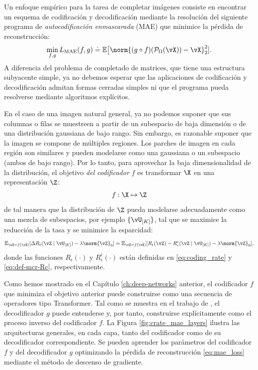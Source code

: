 \documentclass[../../book-main_es.tex]{subfiles}
\begin{document}
Un enfoque empírico para la tarea de completar imágenes consiste en encontrar un
esquema de codificación y decodificación mediante la
resolución del siguiente programa de {\em autocodificación enmascarada} (MAE) que
minimice la pérdida de reconstrucción:
\begin{equation}\label{eq:mae_loss}
    \min_{f, g} L_{\mathrm{MAE}}(f, g) \doteq \mathbb{E}\big[\norm{(g \circ
    f)(\mathcal{P}_\Omega(\vX)) - \vX}_{2}^{2}].
\end{equation}
A diferencia del problema de completado de matrices, que tiene una estructura subyacente simple,
ya no debemos esperar que las aplicaciones de codificación y decodificación
admitan formas cerradas simples ni que el programa pueda resolverse mediante
algoritmos explícitos.

En el caso de una imagen natural general, ya no podemos suponer que sus columnas o
filas se muestreen a partir de un subespacio de baja dimensión o de una distribución gaussiana
de bajo rango. Sin embargo, es razonable suponer que la imagen se compone
de múltiples regiones. Los parches de imagen en cada región son similares y pueden
modelarse como una gaussiana o un subespacio (ambos de bajo rango). Por lo tanto, para aprovechar
la baja dimensionalidad de la distribución, el objetivo \textit{del
codificador} $f$ es transformar $\X$ en una representación $\Z$:
\begin{equation}
    f: \X \mapsto \Z
\end{equation}
de tal manera que la distribución de $\Z$ pueda modelarse adecuadamente como una mezcla
de subespacios, por ejemplo $\{\vU_{[K]}\}$,
tal que se maximice la reducción de la tasa y se minimice la esparcidad:
\begin{equation}\label{eq:sparse_rr}
    \mathbb{E}_{\vZ = f(\vX)}[\Delta R_{\epsilon}(\vZ \mid \vU_{[K]}) - \lambda
    \norm{\vZ}_{0}] = \mathbb{E}_{\vZ = f(\vX)}[R_\epsilon(\vZ) -
        R^{c}_\epsilon(\vZ \mid
    \vU_{[K]}) - \lambda \norm{\vZ}_{0}],
\end{equation}
donde las funciones $R_\epsilon(\cdot)$ y $R^c_\epsilon(\cdot)$ están
definidas en \eqref{eq:coding_rate} y \eqref{eq:def-mcr-Rc}, respectivamente.

Como hemos mostrado en el Capítulo \ref{ch:deep-networks} anterior, el
codificador $f$ que minimiza el objetivo anterior puede construirse como
una secuencia de operadores tipo Transformer. Tal como se muestra en el trabajo de
\cite{Pai2024masked}, el decodificador $g$ puede entenderse y, por tanto,
construirse explícitamente como el proceso inverso del codificador $f$.
La Figura \ref{fig:crate_mae_layers} ilustra las arquitecturas generales, en cada capa,
tanto del codificador como de su decodificador correspondiente.
Se pueden aprender los parámetros del codificador $f$ y del decodificador $g$ 
optimizando la pérdida de reconstrucción \eqref{eq:mae_loss} mediante
el método de descenso de gradiente.
\end{document}
